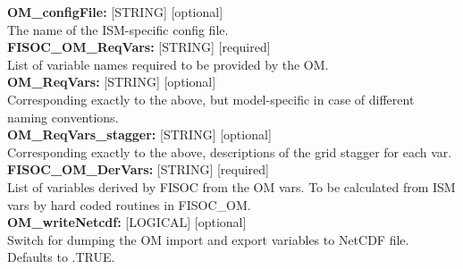 \documentclass[12pt]{article}
\begin{document}
\begin{flushleft}
\textbf{OM\_configFile:}      [STRING] [optional]                          \\
The name of the ISM-specific config file.                                  \\
\vspace{6pt}
\textbf{FISOC\_OM\_ReqVars:}  [STRING] [required]                          \\
List of variable names required to be provided by the OM.                  \\
\vspace{6pt}
\textbf{OM\_ReqVars:}         [STRING] [optional]                          \\
Corresponding exactly to the above, but model-specific in case of different naming conventions. \\
\vspace{6pt}
\textbf{OM\_ReqVars\_stagger:} [STRING] [optional]                         \\
Corresponding exactly to the above, descriptions of the grid stagger for each var. \\
\vspace{6pt}
\textbf{FISOC\_OM\_DerVars:}  [STRING] [required]                          \\
List of variables derived by FISOC from the OM vars.  
To be calculated from ISM vars by hard coded routines in FISOC\_OM.        \\
\vspace{6pt}
\textbf{OM\_writeNetcdf:}   [LOGICAL] [optional]                           \\
Switch for dumping the OM import and export variables to NetCDF file.
Defaults to .TRUE.                                                         \\
\vspace{6pt}



\end{flushleft}
\end{document}
